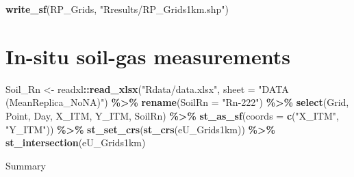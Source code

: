 \documentclass[
  12pt,
]{article}
\newenvironment{Shaded}{\begin{snugshade}}{\end{snugshade}}
\newcommand{\DataTypeTok}[1]{\textcolor[rgb]{0.13,0.29,0.53}{#1}}
\newcommand{\KeywordTok}[1]{\textcolor[rgb]{0.13,0.29,0.53}{\textbf{#1}}}
\newcommand{\NormalTok}[1]{#1}
\newcommand{\OperatorTok}[1]{\textcolor[rgb]{0.81,0.36,0.00}{\textbf{#1}}}
\newcommand{\StringTok}[1]{\textcolor[rgb]{0.31,0.60,0.02}{#1}}
\begin{document}
\begin{Shaded}
\begin{Highlighting}[]
    
  \KeywordTok{write\_sf}\NormalTok{(RP\_Grids, }\StringTok{"Rresults/RP\_Grids1km.shp"}\NormalTok{)}
\end{Highlighting}
\end{Shaded}

\hypertarget{in-situ-soil-gas-measurements}{%
\section{In-situ soil-gas
measurements}\label{in-situ-soil-gas-measurements}}

\begin{Shaded}
\begin{Highlighting}[]
\NormalTok{  Soil\_Rn \textless{}{-}}\StringTok{ }\NormalTok{readxl}\OperatorTok{::}\KeywordTok{read\_xlsx}\NormalTok{(}\StringTok{"Rdata/data.xlsx"}\NormalTok{,}
                               \DataTypeTok{sheet =} \StringTok{"DATA (MeanReplica\_NoNA)"}\NormalTok{) }\OperatorTok{\%\textgreater{}\%}
\StringTok{    }\KeywordTok{rename}\NormalTok{(}\DataTypeTok{SoilRn =} \StringTok{"Rn{-}222"}\NormalTok{) }\OperatorTok{\%\textgreater{}\%}
\StringTok{    }\KeywordTok{select}\NormalTok{(Grid, Point, Day, X\_ITM, Y\_ITM, SoilRn) }\OperatorTok{\%\textgreater{}\%}
\StringTok{    }\KeywordTok{st\_as\_sf}\NormalTok{(}\DataTypeTok{coords =} \KeywordTok{c}\NormalTok{(}\StringTok{"X\_ITM"}\NormalTok{, }\StringTok{"Y\_ITM"}\NormalTok{)) }\OperatorTok{\%\textgreater{}\%}
\StringTok{    }\KeywordTok{st\_set\_crs}\NormalTok{(}\KeywordTok{st\_crs}\NormalTok{(eU\_Grids1km)) }\OperatorTok{\%\textgreater{}\%}
\StringTok{    }\KeywordTok{st\_intersection}\NormalTok{(eU\_Grids1km)}
\end{Highlighting}
\end{Shaded}

Summary
\end{document}
